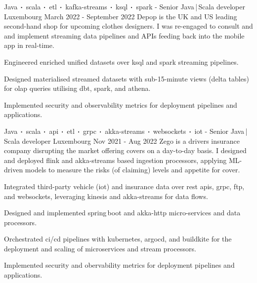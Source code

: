 \begin{cventries}
    \cventry
    {Java$\sqbig$scala$\sqbig$etl$\sqbig$kafka-streams$\sqbig$ksql$\sqbig$spark}
    { - Senior Java\,|\,Scala developer}
    {Luxembourg}
    {March 2022 - September 2022}
    {Depop is the UK and US leading second-hand shop for upcoming clothes designers. I was re-engaged to consult and and implement streaming data pipelines and APIs feeding back into the mobile app in real-time.}
    {
        \begin{cvitems}
            \item{Engineered enriched unified datasets over ksql and spark streaming pipelines.}
            \item{Designed materialised streamed datasets with sub-15-minute views (delta tables) for olap queries utilising dbt, spark, and athena.}
            \item{Implemented security and observability metrics for deployment pipelines and applications.}
        \end{cvitems}
    }


    \cventry
    {Java$\sqbig$scala$\sqbig$api$\sqbig$etl$\sqbig$grpc$\sqbig$akka-streams$\sqbig$websockets$\sqbig$iot}
    { - Senior Java\,|\,Scala developer}
    {Luxembourg}
    {Nov 2021 - Aug 2022}
    {Zego is a drivers insurance company disrupting the market offering covers on a day-to-day basis. I designed and deployed flink and akka-streams based ingestion processors, applying ML-driven models to measure the risks (of claiming) levels and appetite for cover.}
    {
        \begin{cvitems}
            \item{Integrated third-party vehicle (iot) and insurance data over rest apis, grpc, ftp, and websockets, leveraging kinesis and akka-streams for data flows.}
            \item{Designed and implemented spring\,boot and akka-http micro-services and data processors.}
            \item{Orchestrated ci/cd pipelines with kubernetes, argocd, and buildkite for the deployment and scaling of microservices and stream processors.}
            \item{Implemented security and obervability metrics for deployment pipelines and applications.}
        \end{cvitems}
    }


\end{cventries}

